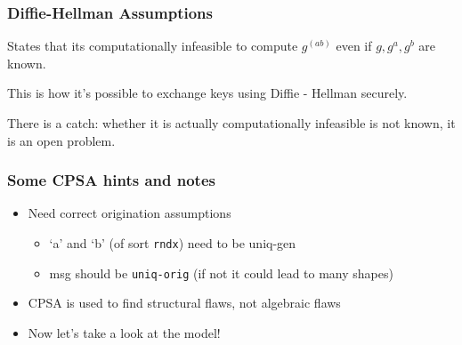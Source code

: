 \documentclass[red]{beamer}
\begin{document}
\begin{frame}\frametitle{Diffie-Hellman Assumptions}
\pause
States that its computationally infeasible to compute \(g^{(ab)}\) even if \(g, g^a, g^b\) are known.

\pause
This is how it's possible to exchange keys using Diffie - Hellman securely.

\pause
There is a catch: 
\pause
whether it is actually computationally infeasible is not known, it is an open problem.
\end{frame}

\begin{frame}\frametitle{Some CPSA hints and notes}
\begin{itemize}
\item Need correct origination assumptions
\begin{itemize}
\item `a' and `b' (of sort \texttt{rndx}) need to be uniq-gen
\item msg should be \texttt{uniq-orig} (if not it could lead to many shapes)
\end{itemize}
\item CPSA is used to find structural flaws, not algebraic flaws 
\pause
\item Now let's take a look at the model!
\end{itemize}
\end{frame}
\end{document}

